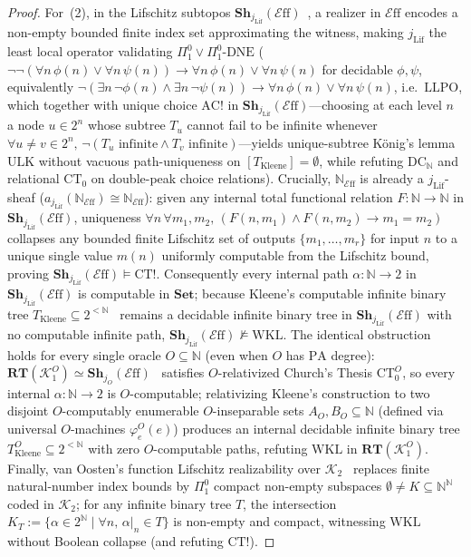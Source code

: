 \documentclass[10pt,twoside,openright]{book}
\theoremstyle{crmplain}
\theoremstyle{crmdef}
\theoremstyle{crmremark}
\newcommand{\Eff}{\mathcal{E}\mathrm{ff}}
\begin{document}
\begin{proof}
For~(2), in the Lifschitz subtopos $\mathbf{Sh}_{j_{\mathrm{Lif}}}(\Eff)$~\cite[\S 4.4]{vanOosten08}, a realizer in $\Eff$ encodes a non-empty bounded finite index set approximating the witness, making $j_{\mathrm{Lif}}$ the least local operator validating $\Pi^0_1 \lor \Pi^0_1\text{-}\mathrm{DNE}$ ($\neg\neg(\forall n\, \phi(n) \lor \forall n\, \psi(n)) \to \forall n\, \phi(n) \lor \forall n\, \psi(n)$ for decidable $\phi, \psi$, equivalently $\neg(\exists n\, \neg\phi(n) \wedge \exists n\, \neg\psi(n)) \to \forall n\, \phi(n) \lor \forall n\, \psi(n)$, i.e.\ $\mathrm{LLPO}$, which together with unique choice $\mathrm{AC}!$ in $\mathbf{Sh}_{j_{\mathrm{Lif}}}(\Eff)$---choosing at each level $n$ a node $u \in 2^n$ whose subtree $T_u$ cannot fail to be infinite whenever $\forall u \neq v \in 2^n,\, \neg(T_u\text{ infinite} \wedge T_v\text{ infinite})$---yields unique-subtree K\"onig's lemma $\mathrm{ULK}$ without vacuous path-uniqueness on $[T_{\mathrm{Kleene}}] = \emptyset$, while refuting $\mathrm{DC}_{\mathbb{N}}$ and relational $\mathrm{CT}_0$ on double-peak choice relations). Crucially, $\mathbb{N}_{\Eff}$ is already a $j_{\mathrm{Lif}}$-sheaf ($a_{j_{\mathrm{Lif}}}(\mathbb{N}_{\Eff}) \cong \mathbb{N}_{\Eff}$): given any internal total functional relation $F : \mathbb{N} \to \mathbb{N}$ in $\mathbf{Sh}_{j_{\mathrm{Lif}}}(\Eff)$, uniqueness $\forall n\,\forall m_1, m_2,\, (F(n, m_1) \wedge F(n, m_2) \to m_1 = m_2)$ collapses any bounded finite Lifschitz set of outputs $\{m_1, \dots, m_r\}$ for input $n$ to a unique single value $m(n)$ uniformly computable from the Lifschitz bound, proving $\mathbf{Sh}_{j_{\mathrm{Lif}}}(\Eff) \models \mathrm{CT}!$. Consequently every internal path $\alpha : \mathbb{N} \to 2$ in $\mathbf{Sh}_{j_{\mathrm{Lif}}}(\Eff)$ is computable in $\mathbf{Set}$; because Kleene's computable infinite binary tree $T_{\mathrm{Kleene}} \subseteq 2^{<\mathbb{N}}$~\cite{Kleene52} remains a decidable infinite binary tree in $\mathbf{Sh}_{j_{\mathrm{Lif}}}(\Eff)$ with no computable infinite path, $\mathbf{Sh}_{j_{\mathrm{Lif}}}(\Eff) \not\models \mathrm{WKL}$. The identical obstruction holds for every single oracle $O \subseteq \mathbb{N}$ (even when $O$ has $\mathrm{PA}$ degree): $\mathbf{RT}(\mathcal{K}_1^O) \simeq \mathbf{Sh}_{j_O}(\Eff)$~\cite{LeeVanOosten13} satisfies $O$-relativized Church's Thesis $\mathrm{CT}_0^O$, so every internal $\alpha : \mathbb{N} \to 2$ is $O$-computable; relativizing Kleene's construction to two disjoint $O$-computably enumerable $O$-inseparable sets $A_O, B_O \subseteq \mathbb{N}$ (defined via universal $O$-machines $\varphi_e^O(e)$) produces an internal decidable infinite binary tree $T_{\mathrm{Kleene}}^O \subseteq 2^{<\mathbb{N}}$ with zero $O$-computable paths, refuting $\mathrm{WKL}$ in $\mathbf{RT}(\mathcal{K}_1^O)$. Finally, van Oosten's function Lifschitz realizability over $\mathcal{K}_2$~\cite[\S 3]{vanOosten90} replaces finite natural-number index bounds by $\Pi^0_1$ compact non-empty subspaces $\emptyset \neq K \subseteq \mathbb{N}^{\mathbb{N}}$ coded in $\mathcal{K}_2$; for any infinite binary tree $T$, the intersection $K_T := \{ \alpha \in 2^{\mathbb{N}} \mid \forall n,\, \alpha|_n \in T \}$ is non-empty and compact, witnessing $\mathrm{WKL}$ without Boolean collapse (and refuting $\mathrm{CT}!$).

\end{proof}
\end{document}
